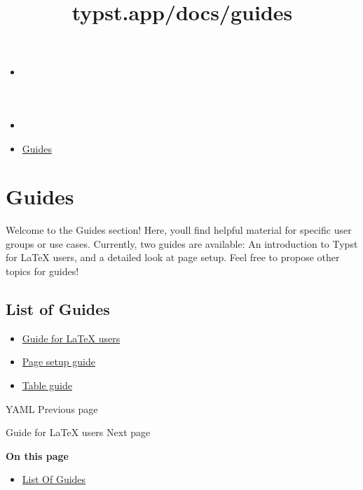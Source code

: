 \title{typst.app/docs/guides}

\begin{itemize}
\tightlist
\item
  \href{/docs}{}
\item
  
\item
  \href{/docs/guides/}{Guides}
\end{itemize}

\section{Guides}\label{guides}

Welcome to the Guides section! Here, you\textquotesingle ll find helpful
material for specific user groups or use cases. Currently, two guides
are available: An introduction to Typst for LaTeX users, and a detailed
look at page setup. Feel free to propose other topics for guides!

\subsection{List of Guides}\label{list-of-guides}

\begin{itemize}
\tightlist
\item
  \href{/docs/guides/guide-for-latex-users/}{Guide for LaTeX users}
\item
  \href{/docs/guides/page-setup-guide/}{Page setup guide}
\item
  \href{/docs/guides/table-guide/}{Table guide}
\end{itemize}

\href{/docs/reference/data-loading/yaml/}{\pandocbounded{}}

{ YAML } { Previous page }

\href{/docs/guides/guide-for-latex-users/}{\pandocbounded{}}

{ Guide for LaTeX users } { Next page }

\textbf{On this page}

\begin{itemize}
\tightlist
\item
  \hyperref[list-of-guides]{List Of Guides}
\end{itemize}

